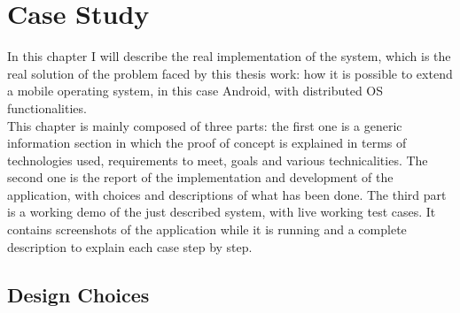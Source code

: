 %
%
\chapter{Case Study}
%
\label{cap:proofofconcept}
%
In this chapter I will describe the real implementation of the system, which is the real solution of the problem faced by this thesis work: how it is possible to extend a mobile operating system, in this case Android, with distributed OS functionalities.\\
This chapter is mainly composed of three parts: the first one is a generic information
section in which the proof of concept is explained in terms of technologies
used, requirements to meet, goals and various technicalities. The second one
is the report of the implementation and development of the application, with
choices and descriptions of what has been done. The third part is a working demo of the
just described system, with live working test cases. It contains screenshots of the
application while it is running and a complete description to explain each case
step by step.
\section{Design Choices}
